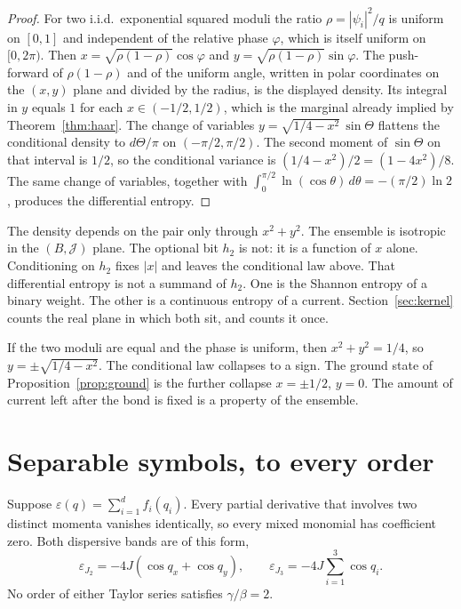\begin{proof}
For two i.i.d.\ exponential squared moduli the ratio
\(\rho=|\psi_i|^2/q\) is uniform on \([0,1]\) and independent of the
relative phase \(\varphi\), which is itself uniform on \([0,2\pi)\).
Then \(x=\sqrt{\rho(1-\rho)}\cos\varphi\) and
\(y=\sqrt{\rho(1-\rho)}\sin\varphi\).
The push-forward of \(\rho(1-\rho)\) and of the uniform angle, written in
polar coordinates on the \((x,y)\) plane and divided by the radius,
is the displayed density.
Its integral in \(y\) equals \(1\) for each \(x\in(-1/2,1/2)\), which is
the marginal already implied by Theorem~\ref{thm:haar}.
The change of variables \(y=\sqrt{1/4-x^2}\,\sin\Theta\) flattens the
conditional density to \(d\Theta/\pi\) on \((-\pi/2,\pi/2)\).
The second moment of \(\sin\Theta\) on that interval is \(1/2\), so the
conditional variance is \((1/4-x^2)/2=(1-4x^2)/8\).
The same change of variables, together with
\(\int_0^{\pi/2}\ln(\cos\theta)\,d\theta=-(\pi/2)\ln 2\),
produces the differential entropy.
\end{proof}

The density depends on the pair only through \(x^2+y^2\).
The ensemble is isotropic in the \((B,\mathcal{J})\) plane.
The optional bit \(h_2\) is not: it is a function of \(x\) alone.
Conditioning on \(h_2\) fixes \(|x|\) and leaves the conditional law above.
That differential entropy is not a summand of \(h_2\).
One is the Shannon entropy of a binary weight.
The other is a continuous entropy of a current.
Section~\ref{sec:kernel} counts the real plane in which both sit, and
counts it once.

If the two moduli are equal and the phase is uniform, then
\(x^2+y^2=1/4\), so \(y=\pm\sqrt{1/4-x^2}\).
The conditional law collapses to a sign.
The ground state of Proposition~\ref{prop:ground} is the further collapse
\(x=\pm 1/2\), \(y=0\).
The amount of current left after the bond is fixed is a property of the
ensemble.

\section{Separable symbols, to every order}
\label{sec:sep}

\begin{proposition}
\label{prop:sep}
Suppose \(\varepsilon(q)=\sum_{i=1}^d f_i(q_i)\).
Every partial derivative that involves two distinct momenta vanishes
identically, so every mixed monomial has coefficient zero.
Both dispersive bands are of this form,
\[
\varepsilon_{J_2}=-4J(\cos q_x+\cos q_y),\qquad
\varepsilon_{J_3}=-4J\sum_{i=1}^3\cos q_i.
\]
No order of either Taylor series satisfies \(\gamma/\beta=2\).
\end{proposition}


